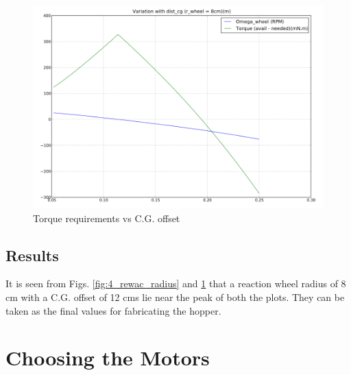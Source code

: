 \begin{figure}[!h]
\centering
\includegraphics[scale=1.8]{fig/rewac_dist.pdf}
\caption{Torque requirements vs C.G. offset}
\label{fig:4_rewac_dist}
\end{figure}

\subsection{Results}
It is seen from Figs. \ref{fig:4_rewac_radius} and \ref{fig:4_rewac_dist} that a reaction wheel radius of 8 cm with a C.G. offset
of 12 cms lie near the peak of both the plots. They can be taken as the final values for fabricating the hopper.

\section{Choosing the Motors}






